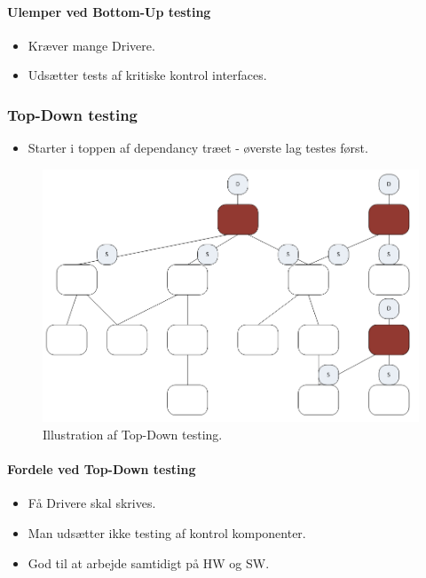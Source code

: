 \paragraph{Ulemper ved Bottom-Up testing}

\begin{itemize}
	\item Kræver mange Drivere.
	\item Udsætter tests af kritiske kontrol interfaces.
\end{itemize}


\subsubsection{Top-Down testing}

\begin{itemize}
	\item Starter i toppen af dependancy træet - øverste lag testes først.
\end{itemize}

\begin{figure}
\centering
\includegraphics[width=0.7\linewidth]{figs/topDown.PNG}
\caption{Illustration af Top-Down testing.}
\label{fig:topDown}
\end{figure}

\paragraph{Fordele ved Top-Down testing}

\begin{itemize}
	\item Få Drivere skal skrives.
	\item Man udsætter ikke testing af kontrol komponenter.
	\item God til at arbejde samtidigt på HW og SW.
\end{itemize}

